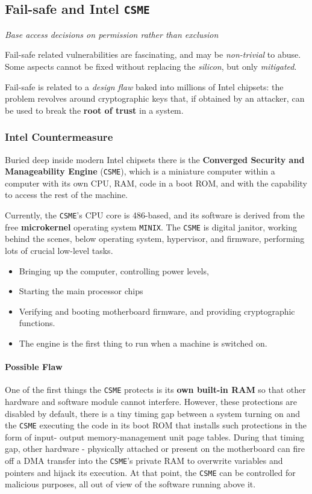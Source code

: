 \subsection{Fail-safe and Intel \texttt{CSME}}
\begin{center}
   \textit{Base access decisions on permission rather than
   exclusion}
\end{center}
Fail-safe related vulnerabilities are fascinating, and may be \textit{non-trivial} to abuse.
Some aspects cannot be fixed without replacing the \textit{silicon}, but only \textit{mitigated}.

Fail-safe is related to a \textit{design flaw} baked into millions of Intel chipsets:
the problem revolves around cryptographic keys that, if obtained by an attacker,
can be used to break the \textbf{root of trust} in a system.

\subsubsection{Intel Countermeasure}
Buried deep inside modern Intel chipsets there is the \textbf{Converged
Security and Manageability Engine} (\texttt{CSME}),
which is a miniature computer within a computer with its own CPU, RAM, code in a boot ROM, and with the capability to access the rest of the machine.

Currently, the \texttt{CSME}'s CPU core is 486-based, and its software is
derived from the free \textbf{microkernel} operating system \texttt{MINIX}.
The \texttt{CSME} is digital janitor, working behind the scenes, below
operating system, hypervisor, and firmware, performing lots of
crucial low-level tasks.
\begin{itemize}
   \item Bringing up the computer, controlling power levels,
   \item Starting the main processor chips
   \item Verifying and booting motherboard firmware, and providing
   cryptographic functions.
   \item The engine is the first thing to run when a machine is switched on.
\end{itemize}

\paragraph{Possible Flaw}
One of the first things the \texttt{CSME} protects is its \textbf{own built-in RAM} so that other hardware and software module cannot interfere.
However, these protections are disabled by default, there is a tiny timing gap between a system turning on and the \texttt{CSME} executing the code
in its boot ROM that installs such protections in the form of input-
output memory-management unit page tables.
During that timing gap, other hardware - physically attached or
present on the motherboard can fire off a DMA transfer into the
\texttt{CSME}’s private RAM to overwrite variables and pointers and hijack
its execution. 
At that point, the \texttt{CSME} can be controlled for
malicious purposes, all out of view of the software running above it.

